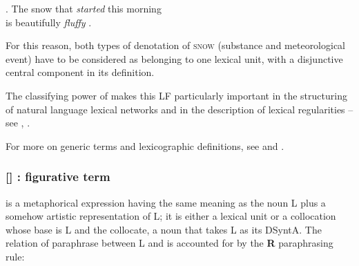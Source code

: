 \begingroup
\small

\ex. The snow that \emph{started}  this morning \\
     \hphantom{.....}is beautifully \emph{fluffy} .

\endgroup

For this reason, both types of denotation of \textsc{snow} (substance and meteorological event) have to be considered as belonging to one lexical unit, with a disjunctive central component in its definition.

 The classifying power of  makes this LF particularly important in the structuring of natural language lexical networks and in the description of lexical regularities -- see , .
 
\begin{furtherreading}
For more on generic terms and lexicographic definitions, see \textcite[Sec.~3]{Polguere2022a} and \textcite{Goddard2017}.
\end{furtherreading}

\subsubsection*{{\small []}  : figurative term}\label{lf:Figur}

 is a metaphorical expression having the same meaning as the noun L plus a somehow artistic representation of L; it is either a lexical unit or a collocation whose base is L and the collocate, a noun that takes L as its DSyntA\thinspace{}. The relation of paraphrase between L and  is accounted for by the \textbf{R} paraphrasing rule:

\begin{center}
\label{txt:RParaphFigur}
\end{center}

